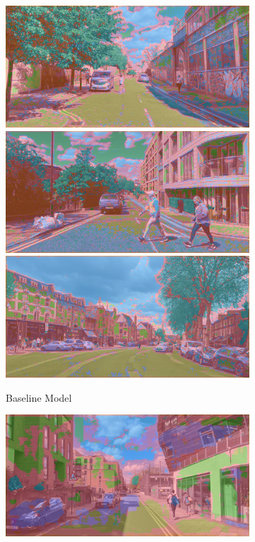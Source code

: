 \begin{figure}[H]
\begin{subfigure}[t]{.32\textwidth}
		\includegraphics[width=\textwidth]{city_images/HackneyScapes/Hackney3164_baseline.png} \\[5pt]
		\includegraphics[width=\textwidth]{city_images/HackneyScapes/Hackney3173_baseline.png} \\[5pt]
		\includegraphics[width=\textwidth]{city_images/HackneyScapes/Hackney3204_baseline.png}
		\caption{Baseline Model}
	\end{subfigure}
	\hfill{}\begin{subfigure}[t]{.32\textwidth}
		\includegraphics[width=\textwidth]{city_images/HackneyScapes/Hackney3159_unet.png} \\[5pt]

\end{subfigure}
\end{figure}
